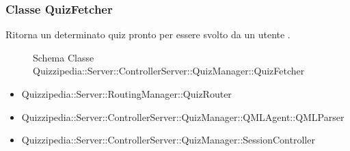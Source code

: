 \subsubsection{Classe QuizFetcher}
Ritorna un determinato quiz pronto per essere svolto da un utente .
\begin{figure}[H]
\centering
\noindent{}
\caption{Schema Classe Quizzipedia::Server::ControllerServer::QuizManager::QuizFetcher}
\end{figure}
\begin{itemize}
\item Quizzipedia::Server::RoutingManager::QuizRouter
\end{itemize}
\begin{itemize}
\item Quizzipedia::Server::ControllerServer::QuizManager::QMLAgent::QMLParser
\item Quizzipedia::Server::ControllerServer::QuizManager::SessionController
\end{itemize}
